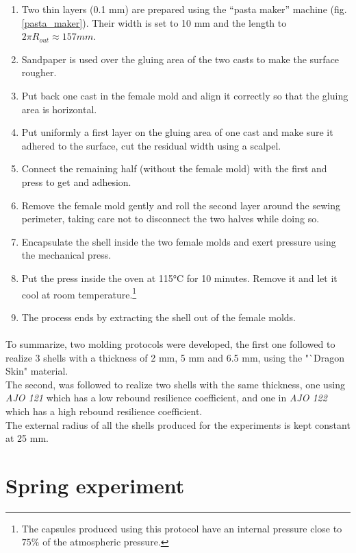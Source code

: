 \begin{enumerate}
	\item Two thin layers (0.1 mm) are prepared using the "`pasta maker"' machine (fig.\ref{pasta_maker}). Their width is set to 10 mm and the length to $2\pi R_{out} \approx 157 mm$.
	\item Sandpaper is used over the gluing area of the two casts to make the surface rougher.
	\item Put back one cast in the female mold and align it correctly so that the gluing area is horizontal.
	\item Put uniformly a first layer on the gluing area of one cast and make sure it adhered to the surface, cut the residual width using a scalpel.
	\item Connect the remaining half (without the female mold) with the first and press to get and adhesion.
	\item Remove the female mold gently and roll the second layer around the sewing perimeter, taking care not to disconnect the two halves while doing so.
	\item Encapsulate the shell inside the two female molds and exert pressure using the mechanical press.
	\item Put the press inside the oven at 115°C for 10 minutes. Remove it and let it cool at room temperature.\footnote{The capsules produced using this protocol have an internal pressure close to $75\%$ of the atmospheric pressure.}
	\item The process ends by extracting the shell out of the female molds.
\end{enumerate}
\paragraph{}
To summarize, two molding protocols were developed, the first one followed to realize  3 shells with a thickness of 2 mm, 5 mm and 6.5 mm, using the "`Dragon Skin" material.\\
The second, was followed to realize two shells with the same thickness, one using \emph{AJO 121} which has a low rebound resilience coefficient, and one in \emph{AJO 122} which has a high rebound resilience coefficient. \\
The external radius of all the shells produced for the experiments is kept constant at 25 mm.
\newpage
\section{Spring experiment}
